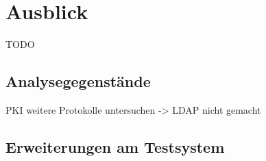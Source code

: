 \chapter{Ausblick}
TODO

\section{Analysegegenstände}
PKI
weitere Protokolle untersuchen -> LDAP nicht gemacht

\section{Erweiterungen am Testsystem}